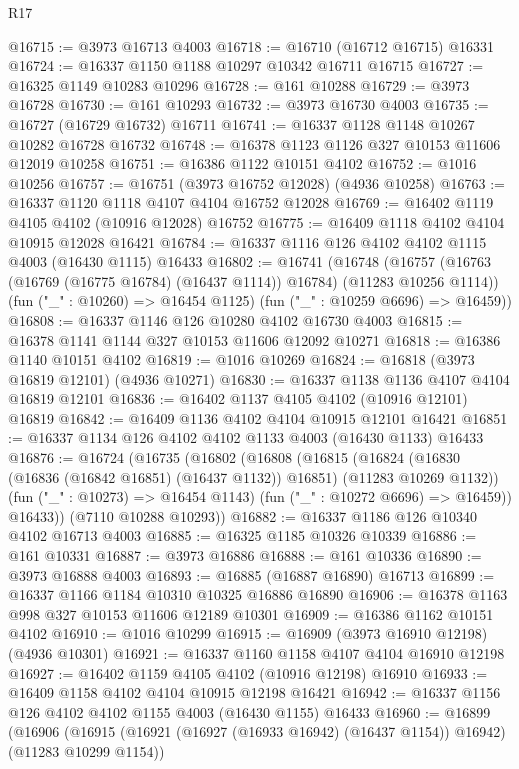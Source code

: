 \begin{lexlean}{R17}
\begin{coremodule}
@16715 := @3973 @16713 @4003
@16718 := @16710 (@16712 @16715) @16331
@16724 := @16337 @1150 @1188 @10297 @10342 @16711 @16715
@16727 := @16325 @1149 @10283 @10296
@16728 := @161 @10288
@16729 := @3973 @16728
@16730 := @161 @10293
@16732 := @3973 @16730 @4003
@16735 := @16727 (@16729 @16732) @16711
@16741 := @16337 @1128 @1148 @10267 @10282 @16728 @16732
@16748 := @16378 @1123 @1126 @327 @10153 @11606 @12019 @10258
@16751 := @16386 @1122 @10151 @4102
@16752 := @1016 @10256
@16757 := @16751 (@3973 @16752 @12028) (@4936 @10258)
@16763 := @16337 @1120 @1118 @4107 @4104 @16752 @12028
@16769 := @16402 @1119 @4105 @4102 (@10916 @12028) @16752
@16775 := @16409 @1118 @4102 @4104 @10915 @12028 @16421
@16784 := @16337 @1116 @126 @4102 @4102 @1115 @4003 (@16430 @1115) @16433
@16802 := @16741
    (@16748
      (@16757 (@16763 (@16769 (@16775 @16784) (@16437 @1114)) @16784) (@11283 @10256 @1114))
      (fun ("_" : @10260) => @16454 @1125)
      (fun ("_" : @10259 @6696) => @16459))
@16808 := @16337 @1146 @126 @10280 @4102 @16730 @4003
@16815 := @16378 @1141 @1144 @327 @10153 @11606 @12092 @10271
@16818 := @16386 @1140 @10151 @4102
@16819 := @1016 @10269
@16824 := @16818 (@3973 @16819 @12101) (@4936 @10271)
@16830 := @16337 @1138 @1136 @4107 @4104 @16819 @12101
@16836 := @16402 @1137 @4105 @4102 (@10916 @12101) @16819
@16842 := @16409 @1136 @4102 @4104 @10915 @12101 @16421
@16851 := @16337 @1134 @126 @4102 @4102 @1133 @4003 (@16430 @1133) @16433
@16876 := @16724
    (@16735
      (@16802
        (@16808
          (@16815
            (@16824 (@16830 (@16836 (@16842 @16851) (@16437 @1132)) @16851) (@11283 @10269 @1132))
            (fun ("_" : @10273) => @16454 @1143)
            (fun ("_" : @10272 @6696) => @16459))
          @16433))
      (@7110 @10288 @10293))
@16882 := @16337 @1186 @126 @10340 @4102 @16713 @4003
@16885 := @16325 @1185 @10326 @10339
@16886 := @161 @10331
@16887 := @3973 @16886
@16888 := @161 @10336
@16890 := @3973 @16888 @4003
@16893 := @16885 (@16887 @16890) @16713
@16899 := @16337 @1166 @1184 @10310 @10325 @16886 @16890
@16906 := @16378 @1163 @998 @327 @10153 @11606 @12189 @10301
@16909 := @16386 @1162 @10151 @4102
@16910 := @1016 @10299
@16915 := @16909 (@3973 @16910 @12198) (@4936 @10301)
@16921 := @16337 @1160 @1158 @4107 @4104 @16910 @12198
@16927 := @16402 @1159 @4105 @4102 (@10916 @12198) @16910
@16933 := @16409 @1158 @4102 @4104 @10915 @12198 @16421
@16942 := @16337 @1156 @126 @4102 @4102 @1155 @4003 (@16430 @1155) @16433
@16960 := @16899
    (@16906
      (@16915 (@16921 (@16927 (@16933 @16942) (@16437 @1154)) @16942) (@11283 @10299 @1154))

\end{coremodule}
\end{lexlean}
